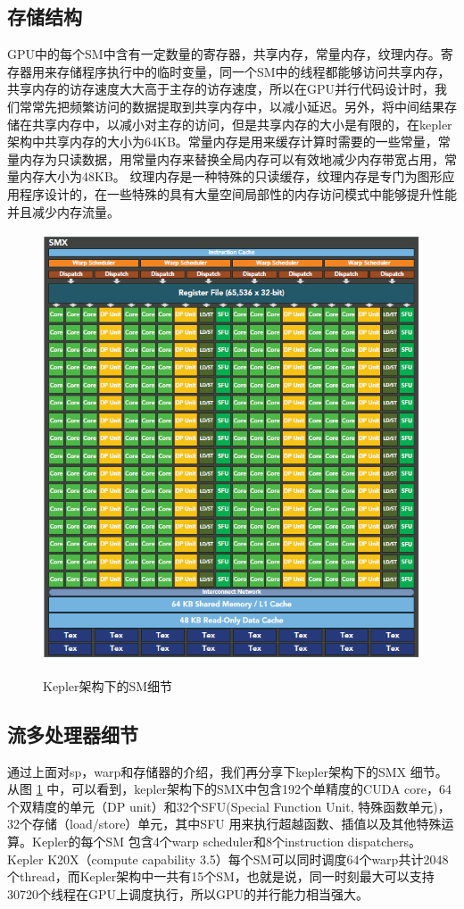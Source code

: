 \subsection{存储结构}
GPU中的每个SM中含有一定数量的寄存器，共享内存，常量内存，纹理内存。寄存器用来存储程序执行中的临时变量，同一个SM中的线程都能够访问共享内存，共享内存的访存速度大大高于主存的访存速度，所以在GPU并行代码设计时，我们常常先把频繁访问的数据提取到共享内存中，以减小延迟。另外，将中间结果存储在共享内存中，以减小对主存的访问，但是共享内存的大小是有限的，在kepler架构中共享内存的大小为64KB。常量内存是用来缓存计算时需要的一些常量，常量内存为只读数据，用常量内存来替换全局内存可以有效地减少内存带宽占用，常量内存大小为48KB。 纹理内存是一种特殊的只读缓存，纹理内存是专门为图形应用程序设计的，在一些特殊的具有大量空间局部性的内存访问模式中能够提升性能并且减少内存流量。
\begin{figure}
\setlength{\belowcaptionskip}{-0.5cm}
  \begin{center}
    {\includegraphics[width=1 \textwidth]{figures/smx.png}}
    \end{center}
  \caption{{\footnotesize{Kepler架构下的SM细节}}}
  \label{sm}
\end{figure}
\subsection{流多处理器细节}
通过上面对sp，warp和存储器的介绍，我们再分享下kepler架构下的SMX 细节。从图 \ref{sm} 中，可以看到，kepler架构下的SMX中包含192个单精度的CUDA core，64个双精度的单元（DP unit）和32个SFU(Special Function Unit, 特殊函数单元)，32个存储（load/store）单元，其中SFU 用来执行超越函数、插值以及其他特殊运算。Kepler的每个SM 包含4个warp scheduler和8个instruction dispatchers。 Kepler K20X（compute capability 3.5）每个SM可以同时调度64个warp共计2048个thread，而Kepler架构中一共有15个SM，也就是说，同一时刻最大可以支持30720个线程在GPU上调度执行，所以GPU的并行能力相当强大。

